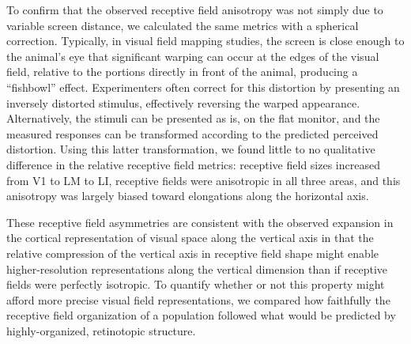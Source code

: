 To confirm that the observed receptive field anisotropy was not simply due to variable screen distance, we calculated the same metrics with a spherical correction. Typically, in visual field mapping studies, the screen is close enough to the animal's eye that significant warping can occur at the edges of the visual field, relative to the portions directly in front of the animal, producing a ``fishbowl'' effect. Experimenters often correct for this distortion by presenting an inversely distorted stimulus, effectively reversing the warped appearance. Alternatively, the stimuli can be presented as is, on the flat monitor, and the measured responses can be transformed according to the predicted perceived distortion. Using this latter transformation, we found little to no qualitative difference in the relative receptive field metrics: receptive field sizes increased from V1 to LM to LI, receptive fields were anisotropic in all three areas, and this anisotropy was largely biased toward elongations along the horizontal axis.

These receptive field asymmetries are consistent with the observed expansion in the cortical representation of visual space along the vertical axis in that the relative compression of the vertical axis in receptive field shape might enable higher-resolution representations along the vertical dimension than if receptive fields were perfectly isotropic. To quantify whether or not this property might afford more precise visual field representations, we compared how faithfully the receptive field organization of a population followed what would be predicted by highly-organized, retinotopic structure. 

